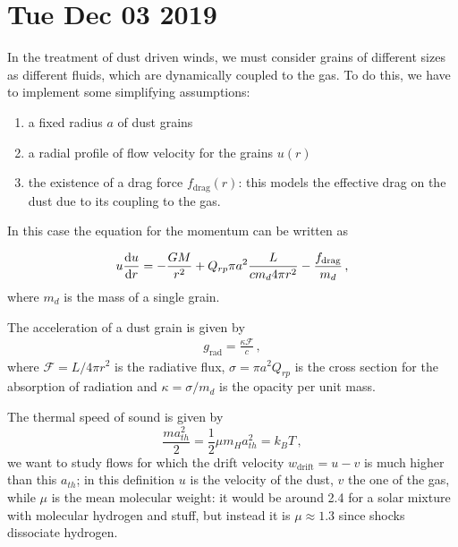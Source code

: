 \documentclass[main.tex]{subfiles}
\begin{document}
\section*{Tue Dec 03 2019}


In the treatment of dust driven winds, we must consider grains of different sizes as different fluids, which are dynamically coupled to the gas.
To do this, we have to implement some simplifying assumptions:
\begin{enumerate}
    \item a fixed radius $a$ of dust grains
    \item a radial profile of flow velocity for the grains $u(r)$
    \item the existence of a drag force $f_{\text{drag}}(r)$: this models the effective drag on the dust due to its coupling to the gas.
\end{enumerate}

In this case the equation for the momentum can be written as

\begin{equation}
u \dv{u}{r} = -\frac{GM}{r^2}+Q_{rp}\pi a^2 \frac{L}{c m_d 4\pi r^2}-\frac{f_{\text{drag}}}{m_d}
\,,
\end{equation}
%
where \(m_d\) is the mass of a single grain. 

The acceleration of a dust grain is given by 
%
\begin{align}
g _{\text{rad}} = \frac{\kappa \mathscr{F}}{c}
\,,
\end{align}
%
where \(\mathscr{F} = L / 4 \pi r^2\) is the radiative flux, \(\sigma = \pi a^2 Q_{rp}\) is the cross section for the absorption of radiation and \(\kappa = \sigma / m_d\) is the opacity per unit mass.

The thermal speed of sound is given by
\begin{equation}
\frac{m a_{th}^2}{2} = \frac{1}{2} \mu m_H a^2_{th} =k_B T
\,,
\end{equation}
we want to study flows for which the drift velocity $w_{\text{drift}}=u-v$ is much higher than this $a_{th}$; in this definition
\(u\) is the velocity of the dust, \(v\) the one of the gas, while \(\mu \) is the mean molecular weight: it would be around \num{2.4} for a solar mixture with molecular hydrogen and stuff, but instead it is 
\(\mu \approx \num{1.3}\) since shocks dissociate hydrogen.
\end{document}
